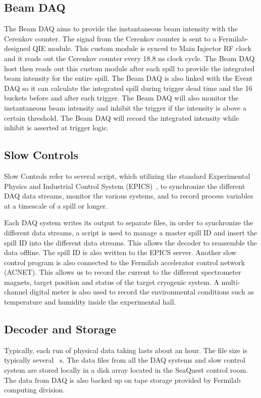\documentclass[../main.tex]{subfiles}
\begin{document}
\subsection{Beam DAQ}
The Beam DAQ aims to provide the instantaneous beam intensity with the Cerenkov counter.
The signal from the Cerenkov counter is sent to a Fermilab-designed QIE module.
This custom module is synced to Main Injector RF clock and it reads out the Cerenkov
counter every 18.8 ns clock cycle. The Beam DAQ host then reads out this custom module
after each spill to provide the integrated beam intensity for the entire spill.
The Beam DAQ is also linked with the Event DAQ so it can calculate the integrated spill
during trigger dead time and the 16 buckets before and after each trigger.
The Beam DAQ will also monitor the instantaneous beam intensity and inhibit the trigger if the
intensity is above a certain threshold. The Beam DAQ will record the integrated intensity
while inhibit is asserted at trigger logic.


\subsection{Slow Controls}
Slow Controls refer to several script, which utilizing the standard Experimental Physics and Industrial Control
System (EPICS)~\cite{dalesio1994}, to synchronize the different DAQ data streams, monitor the various systems,
and to record process variables at a timescale of a spill or longer.

Each DAQ system writes its output to separate files, in order to synchronize the different data streams,
a script is used to manage a master spill ID and insert the spill ID into the different data streams.
This allows the decoder to reassemble the data offline. The spill ID is also written to the EPICS server.
Another slow control program is also connected to the Fermilab accelerator control network (ACNET).
This allows us to record the current to the different spectrometer magnets, target position
and status of the target cryogenic system. A multi-channel digital meter is also used to record
the environmental conditions such as temperature and humidity inside the experimental hall.

\subsection{Decoder and Storage}
Typically, each run of physical data taking lasts about an hour. The file size is typically
several \unit{\giga\byte}s. The data files from all the DAQ systems and slow control system
are stored locally in a disk array located in the SeaQuest control room. The data from DAQ
is also backed up on tape storage provided by Fermilab computing division.
\end{document}
